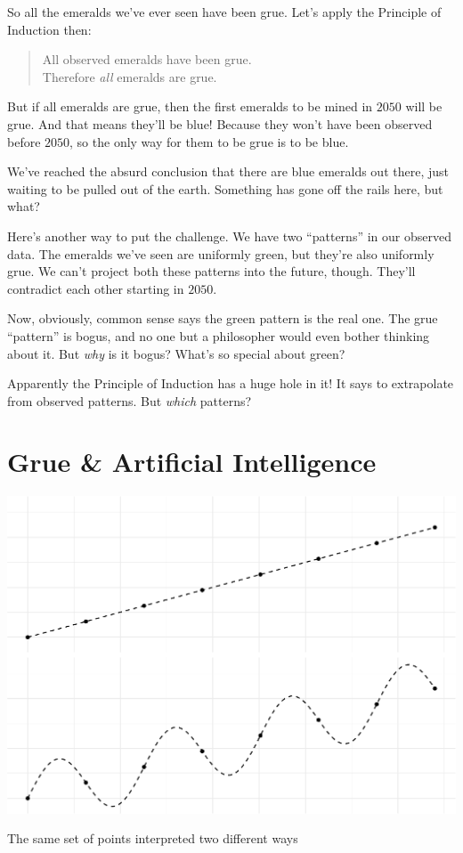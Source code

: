 \documentclass[justified]{tufte-book}
\newenvironment{argument}{\begin{quote}\normalsize}{\end{quote}}
\theoremstyle{definition}
\theoremstyle{definition}
\theoremstyle{definition}
\theoremstyle{remark}
\begin{document}
So all the emeralds we've ever seen have been grue. Let's apply the Principle of Induction then:

\begin{argument}
All observed emeralds have been grue.\\
Therefore \emph{all} emeralds are grue.
\end{argument}

But if all emeralds are grue, then the first emeralds to be mined in \(2050\) will be grue. And that means they'll be blue! Because they won't have been observed before \(2050\), so the only way for them to be grue is to be blue.

We've reached the absurd conclusion that there are blue emeralds out there, just waiting to be pulled out of the earth. Something has gone off the rails here, but what?

Here's another way to put the challenge. We have two ``patterns'' in our observed data. The emeralds we've seen are uniformly green, but they're also uniformly grue. We can't project both these patterns into the future, though. They'll contradict each other starting in \(2050\).

Now, obviously, common sense says the green pattern is the real one. The grue ``pattern'' is bogus, and no one but a philosopher would even bother thinking about it. But \emph{why} is it bogus? What's so special about green?

Apparently the Principle of Induction has a huge hole in it! It says to extrapolate from observed patterns. But \emph{which} patterns?

\hypertarget{grue-artificial-intelligence}{%
\section*{Grue \& Artificial Intelligence}\label{grue-artificial-intelligence}}

\begin{marginfigure}
\includegraphics{_main_files/figure-latex/curvefitting-1} \caption[The same set of points interpreted two different ways]{The same set of points interpreted two different ways}\label{fig:curvefitting}
\end{marginfigure}
\end{document}
